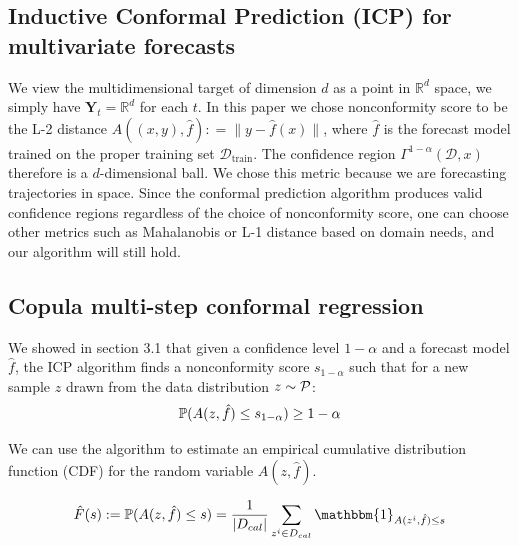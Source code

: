 \subsection{Inductive Conformal Prediction (ICP) for multivariate forecasts}

We view the multidimensional target of dimension $d$ as a point in $\mathbb{R}^d$ space, we simply have $\mathbf{Y}_t = \mathbb{R}^d$ for each  $t$. In this paper we chose nonconformity score to be the L-2 distance $ A((x,y), \hat{f}): = \|y -\hat{f}(x)\|$, where $\hat{f}$ is the forecast model trained on the proper training set $\mathcal{D}_{\text{train}}$. The confidence region $\Gamma^{1-\alpha}(\mathcal{D},x)$ therefore is a $d$-dimensional ball. We chose this  metric because we are forecasting trajectories in space. Since the conformal prediction algorithm produces valid confidence regions regardless of the choice of nonconformity score, one can choose other metrics such as Mahalanobis \cite{johnstone2021conformal} or L-1 \cite{messoudi2021copula} distance based on domain needs, and our algorithm will still hold. 

\subsection{Copula multi-step conformal regression}

We showed in section 3.1 that given a confidence level $1-\alpha$ and a forecast model $\hat{f}$, the ICP algorithm finds a nonconformity score $s_{1-\alpha}$ such that for a new sample $z$ drawn from the data distribution $z \sim {\mathcal{P}}$:
\[
	{\mathbb{P}}(A(z, \hat{f}) \leq s_{1-\alpha} ) \geq 1-\alpha
\]

We can use the algorithm to estimate an empirical cumulative distribution function (CDF) for the random variable $A(z, \hat{f})$.

\begin{equation}
    \hat{F}(s) := \Prob (A(z, \hat{f})\leq s) = \frac{1}{|D_{cal}|} \sum_{z^i \in D_{cal} } \mathbbm{1}_{A(z^i, \hat{f}) \leq s} 
    \label{eq:cdf}
\end{equation}
	

